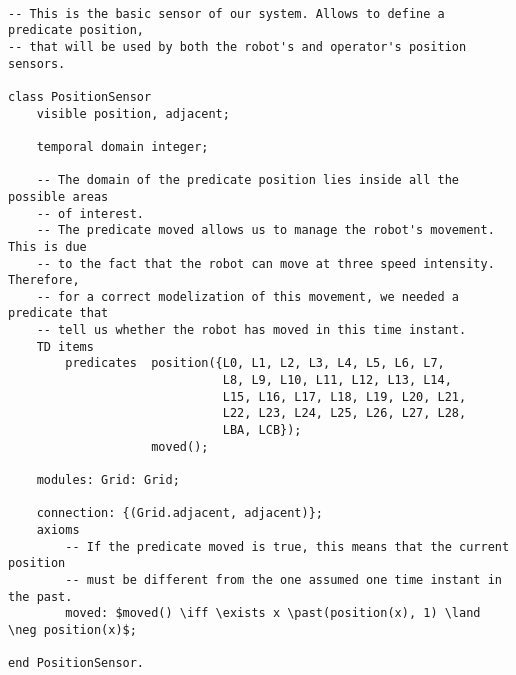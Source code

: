 \begin{lstlisting}[fontadjust, mathescape, frame=single]

-- This is the basic sensor of our system. Allows to define a predicate position,
-- that will be used by both the robot's and operator's position sensors.

class PositionSensor
    visible position, adjacent;

    temporal domain integer;
    
    -- The domain of the predicate position lies inside all the possible areas
    -- of interest. 
    -- The predicate moved allows us to manage the robot's movement. This is due
    -- to the fact that the robot can move at three speed intensity. Therefore, 
    -- for a correct modelization of this movement, we needed a predicate that 
    -- tell us whether the robot has moved in this time instant.
    TD items 
        predicates  position({L0, L1, L2, L3, L4, L5, L6, L7,
                              L8, L9, L10, L11, L12, L13, L14,
                              L15, L16, L17, L18, L19, L20, L21,
                              L22, L23, L24, L25, L26, L27, L28,
                              LBA, LCB});
                    moved();

    modules: Grid: Grid;

    connection: {(Grid.adjacent, adjacent)};
    axioms
        -- If the predicate moved is true, this means that the current position
        -- must be different from the one assumed one time instant in the past.
        moved: $moved() \iff \exists x \past(position(x), 1) \land \neg position(x)$;

end PositionSensor.
\end{lstlisting}